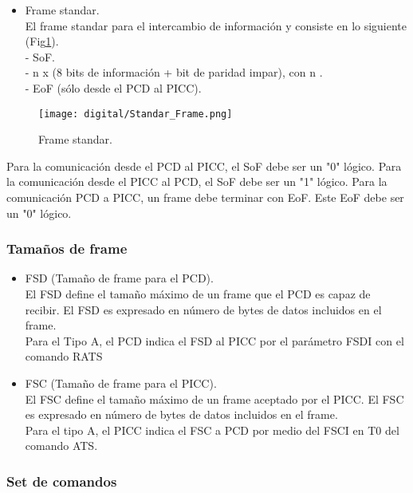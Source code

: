 \begin{itemize}
\item Frame standar.\\
 El frame standar para el intercambio de información y consiste en lo siguiente (Fig\ref{fig:standar_frame}).\\
 - SoF.\\
 - n x (8 bits de información + bit de paridad impar), con n .\\
 - EoF (sólo desde el PCD al PICC).
\end{itemize}

\begin{figure}[H]
\centering
\texttt{[image: digital/Standar\_Frame.png]}
\caption{Frame standar.}
\label{fig:standar_frame}
\end{figure}

Para la comunicación desde el PCD al PICC, el SoF debe ser un "0" lógico.
Para la comunicación desde el PICC al PCD, el SoF debe ser un "1" lógico.
Para la comunicación PCD a PICC, un frame debe terminar con EoF.
Este EoF debe ser un "0" lógico.

\subsubsection{Tamaños de frame}
\begin{itemize}
\item FSD (Tamaño de frame para el PCD).\\
El FSD define el tamaño máximo de un frame que el PCD es capaz de recibir. El FSD es expresado en número de bytes de datos incluidos en el frame.\\ 
Para el Tipo A, el PCD
indica el FSD al PICC por el parámetro FSDI con el comando RATS 
\item FSC (Tamaño de frame para el PICC).\\
El FSC define el tamaño máximo de un frame aceptado por el PICC. El FSC es expresado en número de bytes de datos incluidos en el frame.\\ 
Para el tipo A, el PICC
indica el FSC a PCD por medio del FSCI en T0 del comando ATS.
\end{itemize}


\subsubsection{Set de comandos}

